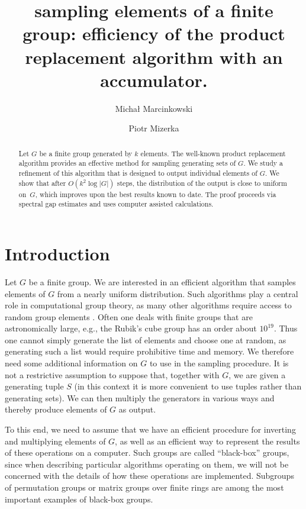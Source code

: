 \documentclass[12pt]{amsart}
\title[Sampling elements of a finite group]{sampling elements of a finite group: efficiency of the product replacement algorithm with an  accumulator.}
\theoremstyle{definition}
\numberwithin{figure}{section}
\numberwithin{table}{section}
\numberwithin{equation}{section}
\begin{document}
\author{Michał Marcinkowski}
\address{Department of Mathematics, University of Wrocław, Poland}
\author{Piotr Mizerka}
\address{Faculty of Mathematics and Computer Science, Adam Mickiewicz Univeristy in Poznań, Poland}


\begin{abstract}
Let $G$ be a finite group generated by $k$ elements. The well-known product replacement algorithm provides an effective method for sampling generating sets of $G$. We study a refinement of this algorithm that is designed to output individual elements of $G$. We show that after $O(k^2\log|G|)$ steps, the distribution of the output is close to uniform on~$G$, which improves upon the best results known to date. The proof proceeds via spectral gap estimates and uses computer assisted calculations.
\end{abstract}

\maketitle


\section{Introduction}

Let $G$ be a finite group. We are interested in an efficient algorithm that samples elements of $G$ from a nearly uniform distribution. Such algorithms play a central role in computational group theory, as many other algorithms require access to random group elements \cite{10.1145/96877.96918, 10.1112/plms/s3-65.3.555}. Often one deals with finite groups that are astronomically large, e.g., the Rubik's cube group has an order about $10^{19}$. Thus one cannot simply generate the list of elements and choose one at random, as generating such a list would require prohibitive time and memory.  We therefore need some additional information on $G$ to use in the sampling procedure. It is not a restrictive assumption to suppose that, together with $G$, we are given a generating tuple $S$ (in this context it is more convenient to use tuples rather than generating sets). We can then multiply the generators in various ways and thereby produce elements of $G$ as output.   

To this end, we need to assume that we have an efficient procedure for inverting and multiplying elements of $G$, as well as an efficient way to represent the results of these operations on a computer. Such groups are called  ``black-box'' groups, since when describing particular algorithms operating on them, we will not be concerned with the details of how these operations are implemented. Subgroups of permutation groups or matrix groups over finite rings are among the most important examples of black-box groups.
\end{document}
